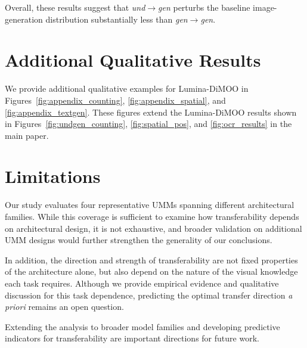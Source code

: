 Overall, these results suggest that \textit{und}$\rightarrow$\textit{gen} perturbs the baseline image-generation distribution substantially less than \textit{gen}$\rightarrow$\textit{gen}.

\clearpage
\section{Additional Qualitative Results}
We provide additional qualitative examples for Lumina-DiMOO in
Figures~\ref{fig:appendix_counting}, \ref{fig:appendix_spatial}, and \ref{fig:appendix_textgen}.
These figures extend the Lumina-DiMOO results shown in Figures~\ref{fig:undgen_counting},
\ref{fig:spatial_pos}, and \ref{fig:ocr_results} in the main paper.
\label{sec:appendix_qualitative}

\clearpage

\clearpage


\clearpage
\section{Limitations}
\label{sec:appendix_limitations}

Our study evaluates four representative UMMs spanning different architectural families. While this coverage is sufficient to examine how transferability depends on architectural design, it is not exhaustive, and broader validation on additional UMM designs would further strengthen the generality of our conclusions.

In addition, the direction and strength of transferability are not fixed properties of the architecture alone, but also depend on the nature of the visual knowledge each task requires. Although we provide empirical evidence and qualitative discussion for this task dependence, predicting the optimal transfer direction \textit{a priori} remains an open question.

Extending the analysis to broader model families and developing predictive indicators for transferability are important directions for future work.
